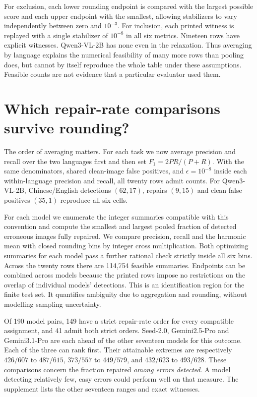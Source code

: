 \documentclass[11pt]{article}
\begin{document}
For exclusion, each lower rounding endpoint is compared with the largest possible score and each upper endpoint with the smallest, allowing stabilizers to vary independently between zero and $10^{-3}$. For inclusion, each printed witness is replayed with a single stabilizer of $10^{-8}$ in all six metrics. Nineteen rows have explicit witnesses. Qwen3-VL-2B has none even in the relaxation. Thus averaging by language explains the numerical feasibility of many more rows than pooling does, but cannot by itself reproduce the whole table under these assumptions. Feasible counts are not evidence that a particular evaluator used them.

\section{Which repair-rate comparisons survive rounding?}
The order of averaging matters. For each task we now average precision and recall over the two languages first and then set $F_1=2PR/(P+R)$. With the same denominators, shared clean-image false positives, and $\epsilon=10^{-8}$ inside each within-language precision and recall, all twenty rows admit counts. For Qwen3-VL-2B, Chinese/English detections $(62,17)$, repairs $(9,15)$ and clean false positives $(35,1)$ reproduce all six cells.

For each model we enumerate the integer summaries compatible with this convention and compute the smallest and largest pooled fraction of detected erroneous images fully repaired. We compare precision, recall and the harmonic mean with closed rounding bins by integer cross multiplication. Both optimizing summaries for each model pass a further rational check strictly inside all six bins. Across the twenty rows there are 114,754 feasible summaries. Endpoints can be combined across models because the printed rows impose no restrictions on the overlap of individual models' detections. This is an identification region for the finite test set. It quantifies ambiguity due to aggregation and rounding, without modelling sampling uncertainty.

Of 190 model pairs, 149 have a strict repair-rate order for every compatible assignment, and 41 admit both strict orders. Seed-2.0, Gemini2.5-Pro and Gemini3.1-Pro are each ahead of the other seventeen models for this outcome. Each of the three can rank first. Their attainable extremes are respectively $426/607$ to $487/615$, $373/557$ to $449/579$, and $432/623$ to $493/628$. These comparisons concern the fraction repaired \emph{among errors detected}. A model detecting relatively few, easy errors could perform well on that measure. The supplement lists the other seventeen ranges and exact witnesses.
\end{document}
